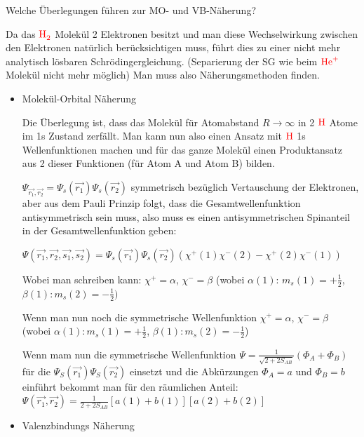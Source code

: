 \documentclass[a5paper,12pt,ngerman,print,grid=front]{kartei}
\let\oldce\ce
\renewcommand*{\ce}[1]{\begingroup\color{red}\oldce{#1}\endgroup}
\begin{document}
	\begin{karte}{
		Welche Überlegungen führen zur MO- und VB-Näherung?
		}
			
		Da das $\ce{H2}$ Molekül 2 Elektronen besitzt und man diese Wechselwirkung zwischen 
		den Elektronen natürlich berücksichtigen muss, führt dies zu einer nicht mehr 
		analytisch lösbaren Schrödingergleichung. 
		(Separierung der SG wie beim $\ce{He^+}$ Molekül nicht mehr möglich)
		Man muss also Näherungsmethoden finden.
		
		\begin{itemize}
			\item Molekül-Orbital Näherung 
			
			Die Überlegung ist, dass das Molekül für Atomabstand $R \rightarrow \infty$ 
			in 2 $\ce{H}$ Atome im 1s Zustand zerfällt. 
			Man kann nun also einen Ansatz mit $\ce{H}$ 1s Wellenfunktionen machen und für 
			das ganze Molekül einen Produktansatz aus 2 dieser Funktionen 
			(für Atom A und Atom B) bilden.
			
			$\Psi_{\vec{r_1},\vec{r_2}} = \Psi_s(\vec{r_1})\Psi_s(\vec{r_2})$ symmetrisch bezüglich
			Vertauschung der Elektronen, aber aus dem Pauli Prinzip
			folgt, dass die Gesamtwellenfunktion antisymmetrisch sein muss, also muss es 
			einen antisymmetrischen Spinanteil in der Gesamtwellenfunktion geben:
			
			$\Psi(\vec{r_1},\vec{r_2},\vec{s_1},\vec{s_2})=
			\Psi_s(\vec{r_1})\Psi_s(\vec{r_2})(\chi^+(1)\chi^-(2) - \chi^+(2)\chi^-(1))$
			
			Wobei man schreiben kann: 
			$\chi^+ = \alpha$, $\chi^- = \beta$ 
			(wobei $\alpha(1)$: $m_s(1) = +\frac{1}{2}$, $\beta(1): m_s(2) = -\frac{1}{2})$
			
			Wenn man nun noch die symmetrische Wellenfunktion 
			$\chi^+ = \alpha$, $\chi^- = \beta$ 
			(wobei 
			$\alpha(1): m_s(1)= +\frac{1}{2}$, 
			$\beta(1):  m_s(2)= -\frac{1}{2}$)
			
			Wenn mam nun die symmetrische Wellenfunktion 
			$\Psi= \frac{1}{\sqrt{2+2S_{AB}}}(\Phi_A+\Phi_B)$
			für die $\Psi_S(\vec{r_1} ) \Psi_S(\vec{r_2} )$ einsetzt und die Abkürzungen $\Phi_A=a$ und 
			$\Phi_B=b$ einführt bekommt man für den räumlichen Anteil:
			$  \Psi( \vec{r_1}, \vec{r_2} ) = \frac{1}{2+2S_{AB}} \left[ a(1)+b(1) \right]\left[ a(2)+b(2) \right]   $
			
		\item Valenzbindungs Näherung 
		

\end{itemize}
\end{karte}
\end{document}
